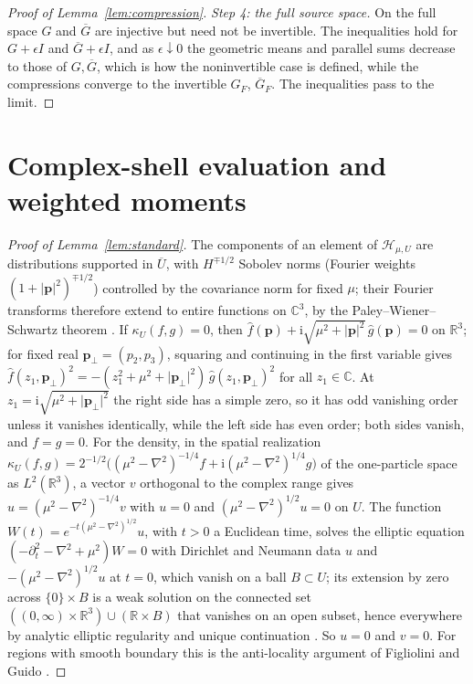 \documentclass[aps,prl,reprint,longbibliography,raggedbottom]{revtex4-2}
\newcommand{\C}{\mathbb C}
\newcommand{\R}{\mathbb R}
\newcommand{\ii}{\mathrm i}
\newcommand{\abs}[1]{\lvert #1\rvert}
\newcommand{\Hh}{\mathcal H}
\newcommand{\bp}{\mathbf p}
\begin{document}
\begin{proof}[Proof of Lemma~\ref{lem:compression}]
\emph{Step 4: the full source space.} On the full space $G$ and
$\overline G$ are injective but need not be invertible. The
inequalities hold for $G+\epsilon I$ and $\overline G+\epsilon I$, and
as $\epsilon\downarrow0$ the geometric means and parallel sums decrease
to those of $G,\overline G$, which is how the noninvertible case is
defined, while the compressions converge to the invertible $G_F$,
$\overline G_F$. The inequalities pass to the limit.
\end{proof}

\section{Complex-shell evaluation and weighted moments}
\label{app:evaluation}

\begin{proof}[Proof of Lemma~\ref{lem:standard}]
The components of an element of $\Hh_{\mu,U}$ are distributions
supported in $\overline U$, with $H^{\mp1/2}$ Sobolev norms (Fourier
weights $(1+\abs\bp^2)^{\mp1/2}$) controlled by the covariance norm
for fixed $\mu$; their Fourier transforms therefore extend to entire
functions on $\C^3$, by the Paley--Wiener--Schwartz theorem
\cite{Hormander03}. If $\kappa_U(f,g)=0$, then
$\hat f(\bp)+\ii\sqrt{\mu^2+\abs\bp^2}\,\hat g(\bp)=0$ on $\R^3$; for
fixed real $\bp_\perp=(p_2,p_3)$, squaring and continuing in the first
variable gives
$\hat f(z_1,\bp_\perp)^2
=-(z_1^2+\mu^2+\abs{\bp_\perp}^2)\,\hat g(z_1,\bp_\perp)^2$
for all $z_1\in\C$. At $z_1=\ii\sqrt{\mu^2+\abs{\bp_\perp}^2}$ the
right side has a simple zero, so it has odd vanishing order unless it
vanishes identically, while the left side has even order; both sides
vanish, and $f=g=0$. For the density, in the spatial realization
$\kappa_U(f,g)=2^{-1/2}\bigl((\mu^2-\nabla^2)^{-1/4}f+\ii(\mu^2-\nabla^2)^{1/4}g\bigr)$ of the
one-particle space as $L^2(\R^3)$, a vector $v$ orthogonal to the
complex range gives $u=(\mu^2-\nabla^2)^{-1/4}v$ with $u=0$ and $(\mu^2-\nabla^2)^{1/2}u=0$ on
$U$. The function $W(t)=e^{-t(\mu^2-\nabla^2)^{1/2}}u$, with $t>0$
a Euclidean time, solves
the elliptic equation $(-\partial_t^2-\nabla^2+\mu^2)W=0$ with
Dirichlet and Neumann data $u$ and $-(\mu^2-\nabla^2)^{1/2}u$ at
$t=0$, which vanish on a ball
$B\subset U$; its extension by zero across $\{0\}\times B$ is a weak
solution on the connected set $((0,\infty)\times\R^3)\cup(\R\times B)$
that vanishes on an open subset, hence everywhere by analytic elliptic
regularity and unique continuation \cite{Hormander03}. So $u=0$ and
$v=0$. For regions with smooth boundary this is the anti-locality
argument of Figliolini and Guido \cite{FG89}.
\end{proof}
\end{document}
